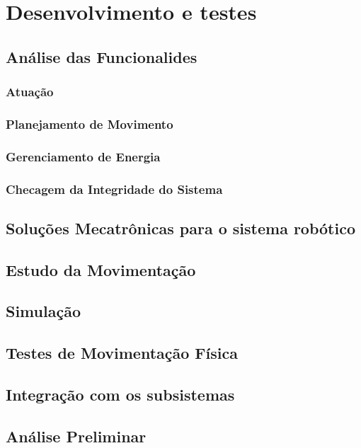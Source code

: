\chapter{Desenvolvimento e testes}
\label{chap:desen_test}

\section{Análise das Funcionalides}
\label{sec:analise_func}

\subsection{Atuação}\label{sec:actuation}

\subsection{Planejamento de Movimento}\label{sec:plan_mov}
		
\subsection{Gerenciamento de Energia}\label{sec:geren_ener} 

\subsection{Checagem da Integridade do Sistema}\label{sec:check_sis}

\section{Soluções Mecatrônicas para o sistema robótico}\label{sec:sol_sis}

\section{Estudo da Movimentação}\label{sec:estud_mov}
\section{Simulação}\label{sec:simul_result}
\section{Testes de Movimentação Física}\label{sec:test_mov}
\section{Integração com os subsistemas}\label{sec:int_subsis}
\section{Análise Preliminar}\label{sec:anal_prem}







